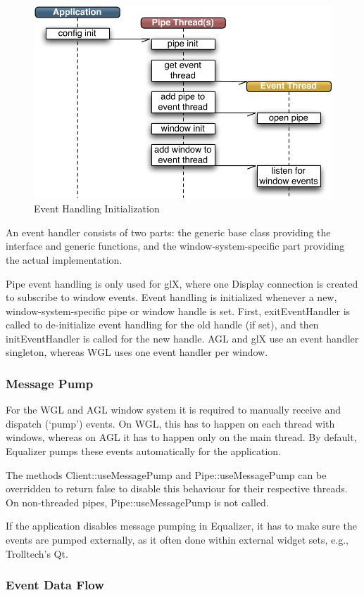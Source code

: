\documentclass[10pt,a4]{scrartcl}
\begin{document}
\begin{figure}
  \includegraphics[width=.4\textwidth]{images/eventInit.pdf}
  {\caption{\small\label{fEventInit}Event Handling Initialization}}
\end{figure}
An event handler consists of two parts: the generic base class providing
the interface and generic functions, and the window-system-specific
part providing the actual implementation. 

Pipe event handling is only used for glX, where one \textsf{Display}
connection is created to subscribe to window events. Event handling is
initialized whenever a new, window-system-specific pipe or window handle
is set. First, \textsf{exitEventHandler} is called to de-initialize
event handling for the old handle (if set), and then
\textsf{initEvent\-Handler} is called for the new handle. AGL and glX use
an event handler singleton, whereas WGL uses one event handler per
window.

\subsubsection{Message Pump}

For the WGL and AGL window system it is required to manually receive and
dispatch (`pump') events. On WGL, this has to happen on each thread with
windows, whereas on AGL it has to happen only on the main thread. By
default, Equalizer pumps these events automatically for the application.

The methods \textsf{Client::useMessagePump} and
\textsf{Pipe::useMessagePump} can be overridden to return \textsf{false}
to disable this behaviour for their respective threads. On non-threaded
pipes, \textsf{Pipe::useMessagePump} is not called.

If the application disables message pumping in Equalizer, it has to make
sure the events are pumped externally, as it often done within external
widget sets, e.g., Trolltech's Qt.


\subsubsection{Event Data Flow}
\end{document}
